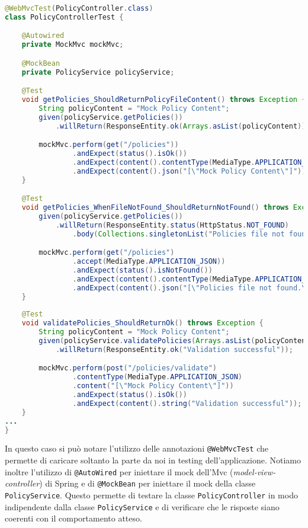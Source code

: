 \begin{lstlisting}[language=Java, caption=PolicyControllerTest, label=code:PolicyControllerTest, basicstyle=\fontsize{9}{10}\ttfamily]
@WebMvcTest(PolicyController.class)
class PolicyControllerTest {

    @Autowired
    private MockMvc mockMvc;

    @MockBean
    private PolicyService policyService;

    @Test
    void getPolicies_ShouldReturnPolicyFileContent() throws Exception {
        String policyContent = "Mock Policy Content";
        given(policyService.getPolicies())
            .willReturn(ResponseEntity.ok(Arrays.asList(policyContent)));

        mockMvc.perform(get("/policies"))
                .andExpect(status().isOk())
                .andExpect(content().contentType(MediaType.APPLICATION_JSON))
                .andExpect(content().json("[\"Mock Policy Content\"]"));
    }

    @Test
    void getPolicies_WhenFileNotFound_ShouldReturnNotFound() throws Exception {
        given(policyService.getPolicies())
            .willReturn(ResponseEntity.status(HttpStatus.NOT_FOUND)
                .body(Collections.singletonList("Policies file not found.")));

        mockMvc.perform(get("/policies")
                .accept(MediaType.APPLICATION_JSON))
                .andExpect(status().isNotFound())
                .andExpect(content().contentType(MediaType.APPLICATION_JSON))
                .andExpect(content().json("[\"Policies file not found.\"]"));
    }
    
    @Test
    void validatePolicies_ShouldReturnOk() throws Exception {
        String policyContent = "Mock Policy Content";
        given(policyService.validatePolicies(Arrays.asList(policyContent)))
            .willReturn(ResponseEntity.ok("Validation successful"));

        mockMvc.perform(post("/policies/validate")
                .contentType(MediaType.APPLICATION_JSON)
                .content("[\"Mock Policy Content\"]"))
                .andExpect(status().isOk())
                .andExpect(content().string("Validation successful"));
    }
...
}
\end{lstlisting}
In questo caso si può notare l'utilizzo delle annotazioni \texttt{@WebMvcTest} che permette di caricare soltanto la parte da noi in testing dell'applicazione. Notiamo inoltre l'utilizzo di \texttt{@AutoWired} per iniettare il mock dell'Mvc (\emph{model-view-controller}) di Spring e di \texttt{@MockBean} per iniettare il mock della classe \texttt{PolicyService}. Questo permette di testare la classe \texttt{PolicyController} in modo indipendente dalla classe \texttt{PolicyService} e di verificare che le risposte siano coerenti con il comportamento atteso.\medbreak
